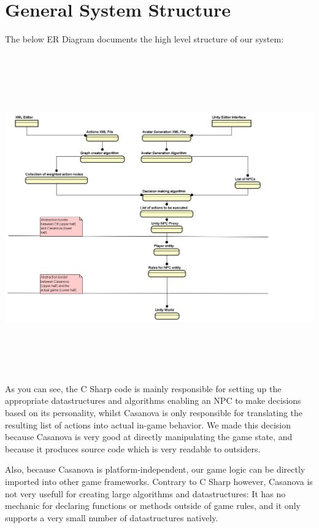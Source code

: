 \documentclass[11pt]{article} %
\begin{document}
\newpage
\section{General System Structure}
The below ER Diagram documents the high level structure of our system:

~\\
\includegraphics[width=20cm, height=13cm]{SystemEr}
~\\

As you can see, the C Sharp code is mainly responsible for setting up the appropriate datastructures and algorithms enabling an NPC to make decisions based on its personality, whilst Casanova is only responsible for translating the resulting list of actions into actual in-game behavior. We made this decision because Casanova is very good at directly manipulating the game state, and because it produces source code which is very readable to outsiders. 

\newpage
Also, because Casanova is platform-independent, our game logic can be directly imported into other game frameworks. Contrary to C Sharp however, Casanova is not very usefull for creating large algorithms and datastructures: It has no mechanic for declaring functions or methods outside of game rules, and it only supports a very small number of datastructures natively. 
\end{document}
